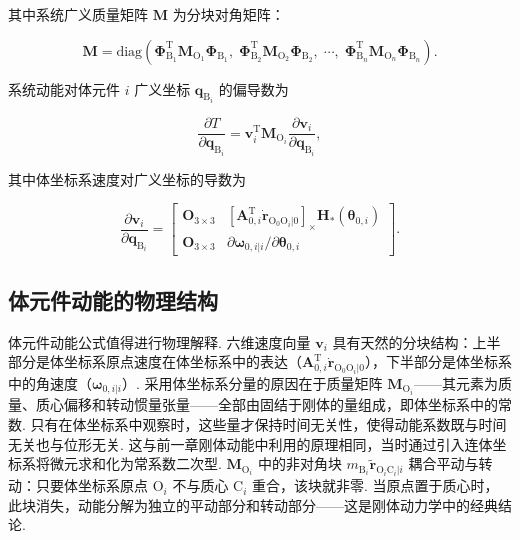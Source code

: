 \begin{conclusion}[结论 9.6]
其中系统广义质量矩阵 $\boldsymbol{M}$ 为分块对角矩阵：

\[
\boldsymbol{M} = \text{diag} \left( \boldsymbol{\Phi}_{\text{B}_1}^\text{T} \boldsymbol{M}_{\text{O}_1} \boldsymbol{\Phi}_{\text{B}_1}, \; \boldsymbol{\Phi}_{\text{B}_2}^\text{T} \boldsymbol{M}_{\text{O}_2} \boldsymbol{\Phi}_{\text{B}_2}, \; \cdots, \; \boldsymbol{\Phi}_{\text{B}_n}^\text{T} \boldsymbol{M}_{\text{O}_n} \boldsymbol{\Phi}_{\text{B}_n} \right).
\]

系统动能对体元件 $i$ 广义坐标 $\boldsymbol{q}_{\text{B}_i}$ 的偏导数为

\[
\frac{\partial T}{\partial \boldsymbol{q}_{\text{B}_i}} = \boldsymbol{v}_i^\text{T} \boldsymbol{M}_{\text{O}_i} \frac{\partial \boldsymbol{v}_i}{\partial \boldsymbol{q}_{\text{B}_i}},
\]

其中体坐标系速度对广义坐标的导数为

\[
\frac{\partial \boldsymbol{v}_i}{\partial \boldsymbol{q}_{\text{B}_i}} = \begin{bmatrix} \boldsymbol{O}_{3\times 3} & [\boldsymbol{A}_{0,i}^\text{T} \dot{\boldsymbol{r}}_{\text{O}_0\text{O}_i|0}]_\times \boldsymbol{H}_*(\boldsymbol{\theta}_{0,i}) \\ \boldsymbol{O}_{3\times 3} & \partial \boldsymbol{\omega}_{0,i|i} / \partial \boldsymbol{\theta}_{0,i} \end{bmatrix}.
\]
\end{conclusion}
\subsection{体元件动能的物理结构}
体元件动能公式值得进行物理解释. 六维速度向量 $\boldsymbol{v}_i$ 具有天然的分块结构：上半部分是体坐标系原点速度在体坐标系中的表达（$\boldsymbol{A}_{0,i}^\text{T} \dot{\boldsymbol{r}}_{\text{O}_0\text{O}_i|0}$），下半部分是体坐标系中的角速度（$\boldsymbol{\omega}_{0,i|i}$）. 采用体坐标系分量的原因在于质量矩阵 $\boldsymbol{M}_{\text{O}_i}$——其元素为质量、质心偏移和转动惯量张量——全部由固结于刚体的量组成，即体坐标系中的常数. 只有在体坐标系中观察时，这些量才保持时间无关性，使得动能系数既与时间无关也与位形无关. 这与前一章刚体动能中利用的原理相同，当时通过引入连体坐标系将微元求和化为常系数二次型.
$\boldsymbol{M}_{\text{O}_i}$ 中的非对角块 $m_{\text{B}_i} \tilde{\boldsymbol{r}}_{\text{O}_i\text{C}_i|i}$ 耦合平动与转动：只要体坐标系原点 $\text{O}_i$ 不与质心 $\text{C}_i$ 重合，该块就非零. 当原点置于质心时，此块消失，动能分解为独立的平动部分和转动部分——这是刚体动力学中的经典结论.
